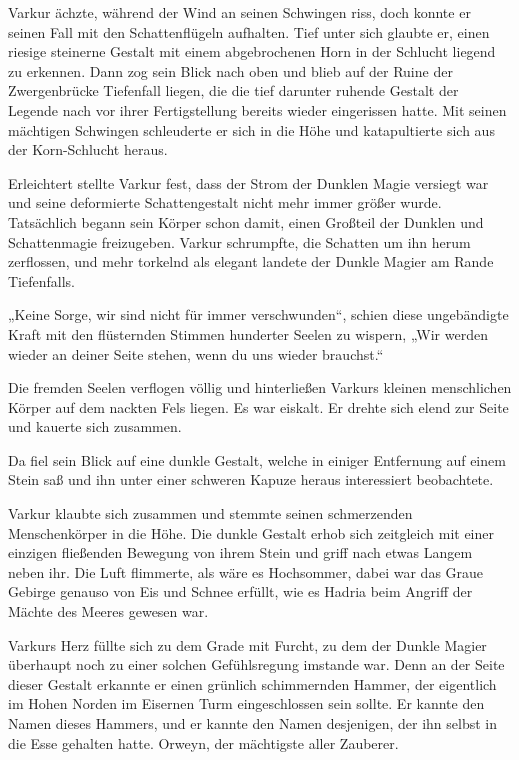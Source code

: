 Varkur ächzte, während der Wind an seinen Schwingen riss, doch konnte er seinen Fall mit den Schattenflügeln aufhalten. Tief unter sich glaubte er, einen riesige steinerne Gestalt mit einem abgebrochenen Horn in der Schlucht liegend zu erkennen. Dann zog sein Blick nach oben und blieb auf der Ruine der Zwergenbrücke Tiefenfall liegen, die die tief darunter ruhende Gestalt der Legende nach vor ihrer Fertigstellung bereits wieder eingerissen hatte. Mit seinen mächtigen Schwingen schleuderte er sich in die Höhe und katapultierte sich aus der Korn-Schlucht heraus.

Erleichtert stellte Varkur fest, dass der Strom der Dunklen Magie versiegt war und seine deformierte Schattengestalt nicht mehr immer größer wurde. Tatsächlich begann sein Körper schon damit, einen Großteil der Dunklen und Schattenmagie freizugeben. Varkur schrumpfte, die Schatten um ihn herum zerflossen, und mehr torkelnd als elegant landete der Dunkle Magier am Rande Tiefenfalls.

„Keine Sorge, wir sind nicht für immer verschwunden“, schien diese ungebändigte Kraft mit den flüsternden Stimmen hunderter Seelen zu wispern, „Wir werden wieder an deiner Seite stehen, wenn du uns wieder brauchst.“

Die fremden Seelen verflogen völlig und hinterließen Varkurs kleinen menschlichen Körper auf dem nackten Fels liegen. Es war eiskalt. Er drehte sich elend zur Seite und kauerte sich zusammen.

Da fiel sein Blick auf eine dunkle Gestalt, welche in einiger Entfernung auf einem Stein saß und ihn unter einer schweren Kapuze heraus interessiert beobachtete.

Varkur klaubte sich zusammen und stemmte seinen schmerzenden Menschenkörper in die Höhe. Die dunkle Gestalt erhob sich zeitgleich mit einer einzigen fließenden Bewegung von ihrem Stein und griff nach etwas Langem neben ihr. Die Luft flimmerte, als wäre es Hochsommer, dabei war das Graue Gebirge genauso von Eis und Schnee erfüllt, wie es Hadria beim Angriff der Mächte des Meeres gewesen war.

Varkurs Herz füllte sich zu dem Grade mit Furcht, zu dem der Dunkle Magier überhaupt noch zu einer solchen Gefühlsregung imstande war. Denn an der Seite dieser Gestalt erkannte er einen grünlich schimmernden Hammer, der eigentlich im Hohen Norden im Eisernen Turm eingeschlossen sein sollte. Er kannte den Namen dieses Hammers, und er kannte den Namen desjenigen, der ihn selbst in die Esse gehalten hatte. Orweyn, der mächtigste aller Zauberer.

